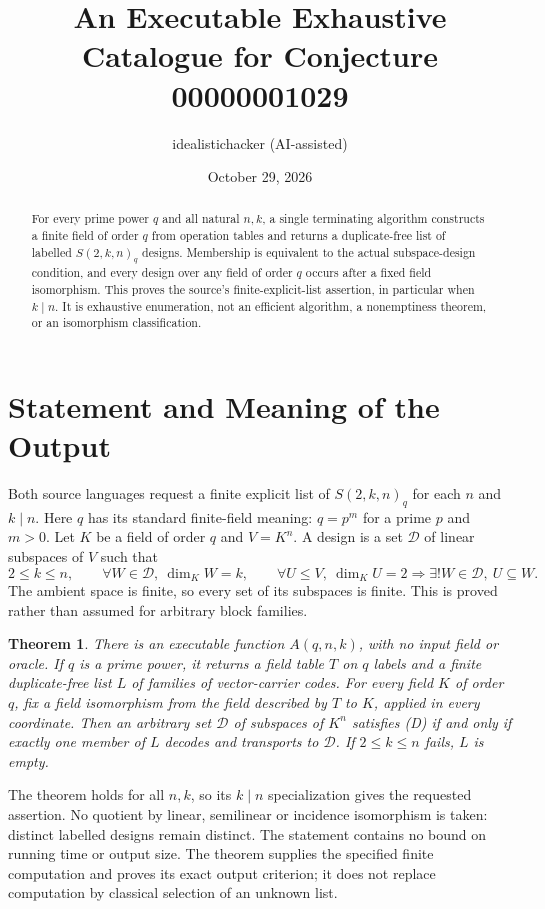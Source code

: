 \documentclass[11pt]{article}
\title{An Executable Exhaustive Catalogue for Conjecture 00000001029}
\author{idealistichacker \quad (AI-assisted)}
\date{October 29, 2026}
\newtheorem{theorem}{Theorem}
\begin{document}
\maketitle
\begin{abstract}
For every prime power $q$ and all natural $n,k$, a single terminating
algorithm constructs a finite field of order $q$ from operation tables
and returns a duplicate-free list of labelled $S(2,k,n)_q$ designs.
Membership is equivalent to the actual subspace-design condition, and
every design over any field of order $q$ occurs after a fixed field
isomorphism. This proves the source's finite-explicit-list assertion,
in particular when $k\mid n$. It is exhaustive enumeration, not an
efficient algorithm, a nonemptiness theorem, or an isomorphism classification.
\end{abstract}

\section{Statement and Meaning of the Output}
Both source languages request a finite explicit list of $S(2,k,n)_q$
for each $n$ and $k\mid n$. Here $q$ has its standard finite-field meaning:
$q=p^m$ for a prime $p$ and $m>0$. Let $K$ be a field of order $q$ and
$V=K^n$. A design is a set $\mathcal D$ of linear subspaces of $V$ such that
\begin{equation}
  2\leq k\leq n,\qquad
  \forall W\in\mathcal D,\ \dim_KW=k,\qquad
  \forall U\leq V,\ \dim_KU=2\Longrightarrow
    \exists!W\in\mathcal D,\ U\subseteq W.       \tag{D}
\end{equation}
The ambient space is finite, so every set of its subspaces is finite.
This is proved rather than assumed for arbitrary block families.

\begin{theorem}\label{thm:main}
There is an executable function $A(q,n,k)$, with no input field or
oracle. If $q$ is a prime power, it returns a field table $T$ on $q$
labels and a finite duplicate-free list $L$ of families of vector-carrier
codes. For every field $K$ of order $q$, fix a field isomorphism from
the field described by $T$ to $K$, applied in every coordinate.
Then an arbitrary set $\mathcal D$ of subspaces of $K^n$ satisfies
\textup{(D)} if and only if exactly one member of $L$ decodes and
transports to $\mathcal D$. If $2\leq k\leq n$ fails, $L$ is empty.
\end{theorem}
The theorem holds for all $n,k$, so its $k\mid n$ specialization gives
the requested assertion. No quotient by linear, semilinear or incidence
isomorphism is taken: distinct labelled designs remain distinct.
The statement contains no bound on running time or output size.
The theorem supplies the specified finite computation and proves its
exact output criterion; it does not replace computation by classical
selection of an unknown list.
\end{document}
